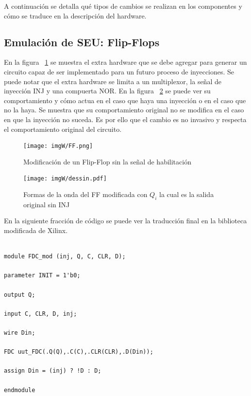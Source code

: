 \documentclass[a4paper,openright,12pt]{report}
\begin{document}
A continuación se detalla qué tipos de cambios se realizan en los componentes y cómo se traduce en la descripción del hardware.



\subsection{Emulación de SEU: Flip-Flops}
En la figura ~\ref{FF} se muestra el extra hardware que se debe agregar para generar un circuito capaz de ser implementado para un futuro proceso de inyecciones. Se puede notar que el extra hardware se limita a un multiplexor, la señal de inyección INJ y una compuerta NOR.
En la figura ~\ref{FFS} se puede ver su comportamiento y cómo  actua en el caso que haya una inyección o en el caso que no la haya. Se muestra que su comportamiento original no se modifica en el caso en que la inyección  no suceda. Es por ello que el cambio es no invasivo y respecta el comportamiento original del circuito.


\begin{figure}[H]
	\centering
	\texttt{[image: imgW/FF.png]}
	\caption{Modificación de un Flip-Flop sin la señal de habilitación}
	\label{FF}
\end{figure}

\begin{figure}[H]
	\centering
	\texttt{[image: imgW/dessin.pdf]}
	\caption{Formas de la onda del FF modificada con  $Q_{i}$ la cual es la salida original sin INJ }
	\label{FFS}
\end{figure}

En la siguiente fracción de  código se puede ver la traducción final en la biblioteca modificada de Xilinx.
\lstset{frame=tb,
  language=VHDL,
  aboveskip=3mm,
  belowskip=3mm,
  showstringspaces=false,
  columns=flexible,
  basicstyle=\ttfamily,
  numbers=none,
  breakatwhitespace=true,
  tabsize=2
}

\begin{lstlisting}

module FDC_mod (inj, Q, C, CLR, D);

parameter INIT = 1'b0;

output Q;

input C, CLR, D, inj;

wire Din;

FDC uut_FDC(.Q(Q),.C(C),.CLR(CLR),.D(Din));

assign Din = (inj) ? !D : D;

endmodule

\end{lstlisting}
\end{document}
